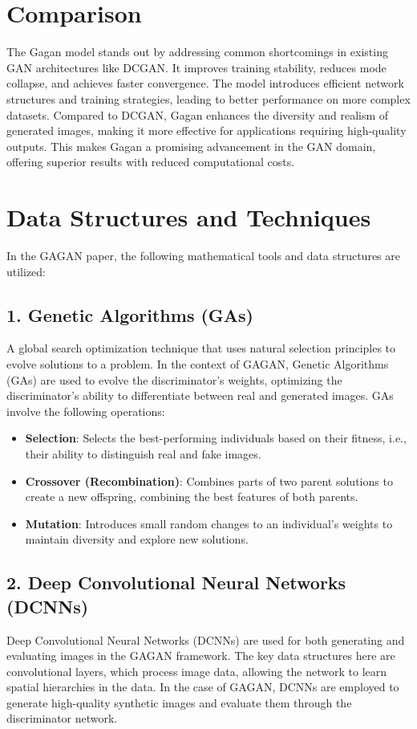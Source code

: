 \documentclass[a4paper,12pt]{article}
\begin{document}
\section*{Comparison}
The Gagan model stands out by addressing common shortcomings in existing GAN architectures like DCGAN. It improves training stability, reduces mode collapse, and achieves faster convergence. The model introduces efficient network structures and training strategies, leading to better performance on more complex datasets. Compared to DCGAN, Gagan enhances the diversity and realism of generated images, making it more effective for applications requiring high-quality outputs. This makes Gagan a promising advancement in the GAN domain, offering superior results with reduced computational costs.

\section*{Data Structures and Techniques}
In the GAGAN paper, the following mathematical tools and data structures are utilized:

\subsection*{1. Genetic Algorithms (GAs)}
A global search optimization technique that uses natural selection principles to evolve solutions to a problem. In the context of GAGAN, Genetic Algorithms (GAs) are used to evolve the discriminator's weights, optimizing the discriminator's ability to differentiate between real and generated images. GAs involve the following operations:
\begin{itemize}
    \item \textbf{Selection}: Selects the best-performing individuals based on their fitness, i.e., their ability to distinguish real and fake images.
    \item \textbf{Crossover (Recombination)}: Combines parts of two parent solutions to create a new offspring, combining the best features of both parents.
    \item \textbf{Mutation}: Introduces small random changes to an individual’s weights to maintain diversity and explore new solutions.
\end{itemize}

\subsection*{2. Deep Convolutional Neural Networks (DCNNs)}
Deep Convolutional Neural Networks (DCNNs) are used for both generating and evaluating images in the GAGAN framework. The key data structures here are convolutional layers, which process image data, allowing the network to learn spatial hierarchies in the data. In the case of GAGAN, DCNNs are employed to generate high-quality synthetic images and evaluate them through the discriminator network.
\end{document}
